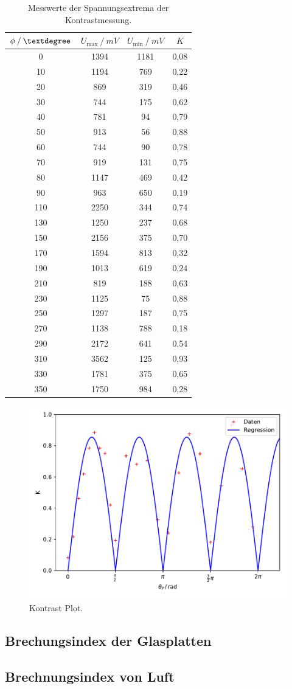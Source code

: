 \begin{table}[H]
\centering
\begin{tabular}{c|c|c|c}
{$\phi \:/\: \textdegree$} & {$U_\text{max} \:/\: \si{mV}$} & {$U_\text{min} \:/\: \si{mV}$} & {$K$}\\
\midrule
0 & 1394 & 1181 & 0,08 \\
10 & 1194 & 769 & 0,22 \\
20 & 869 & 319 & 0,46 \\
30 & 744 & 175 & 0,62 \\
40 & 781 & 94 & 0,79 \\
50 & 913 & 56 & 0,88 \\
60 & 744 & 90 & 0,78 \\
70 & 919 & 131 & 0,75 \\
80 & 1147 & 469 & 0,42 \\
90 & 963 & 650 & 0,19 \\
110 & 2250 & 344 & 0,74 \\
130 & 1250 & 237 & 0,68 \\
150 & 2156 & 375 & 0,70 \\
170 & 1594 & 813 & 0,32 \\
190 & 1013 & 619 & 0,24 \\
210 & 819 & 188 & 0,63 \\
230 & 1125 & 75 & 0,88 \\
250 & 1297 & 187 & 0,75 \\
270 & 1138 & 788 & 0,18 \\
290 & 2172 & 641 & 0,54 \\
310 & 3562 & 125 & 0,93 \\
330 & 1781 & 375 & 0,65 \\
350 & 1750 & 984 & 0,28 \\
\end{tabular}
\caption{Messwerte der Spannungsextrema der Kontrastmessung.}
\label{tab:kontrast}
\end{table}
\begin{figure}[H]
  \centering
  \includegraphics{bilder/kontrastplot.pdf}
  \caption{Kontrast Plot.}
  \label{fig:kontrastplot}
\end{figure}

\subsection{Brechungsindex der Glasplatten}


\subsection{Brechnungsindex von Luft}
